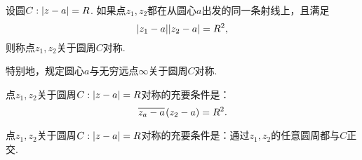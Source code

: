\begin{definition}
设圆\(C: \abs{z - a} = R\).
如果点\(z_1,z_2\)都在从圆心\(a\)出发的同一条射线上，且满足\[
\abs{z_1 - a} \abs{z_2 - a} = R^2,
\]则称点\(z_1,z_2\)关于圆周\(C\)对称.

特别地，规定圆心\(a\)与无穷远点\(\infty\)关于圆周\(C\)对称.
\end{definition}

\begin{theorem}
点\(z_1,z_2\)关于圆周\(C: \abs{z - a} = R\)对称的充要条件是：\[
\kern1pt\overline{z_a - a}\kern1pt (z_2 - a) = R^2.
\]
\end{theorem}

\begin{theorem}
点\(z_1,z_2\)关于圆周\(C: \abs{z - a} = R\)对称的充要条件是：通过\(z_1,z_2\)的任意圆周都与\(C\)正交.
\end{theorem}
